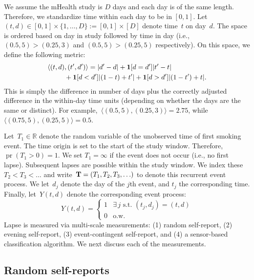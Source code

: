 \documentclass[11pt]{amsart}
\def\pr{\mathop{\text{pr}}\nolimits}
\def\pr{\mathop{\text{pr}}\nolimits}
\def\indicator{{\bf 1}}
\def\bfT{{\bf T}}
\begin{document}
We assume the mHealth study is $D$ days and each day is of the same
length. Therefore, we standardize time within each day to be in
$[0,1]$. Let $(t,d) \in [0,1] \times \{ 1,\ldots, D \} := [0,1] \times
[D]$ denote time~$t$ on day~$d$. The space is ordered based on day in
study followed by time in day (i.e., $(0.5, 5) > (0.25,3)$ and
$(0.5, 5) > (0.25, 5)$ respectively).  On this space, we define the
following metric:
\begin{align*}
\langle (t,d) &, (t^\prime, d^\prime ) \rangle = |d^\prime - d| +
\indicator [ d = d^\prime ] | t^\prime  - t | \\ 
&+ \indicator[ d < d^\prime ] | (1-t) + t^\prime | + \indicator[ d >
  d^\prime ] | (1-t^\prime) + t |.
\end{align*}
This is simply the difference in number of days plus the correctly
adjusted difference in the within-day time units (depending on whether
the days are the same or distinct).
For example,~$\langle (0.5, 5), (0.25, 3) \rangle = 2.75$, while
$\langle (0.75, 5), (0.25, 5) \rangle = 0.5$.

Let~$T_1 \in \mathbb{R}$ denote the random variable of the unobserved
time of first smoking event. The time origin is set to the start of
the study window.  Therefore,~$\pr (T_1 > 0 ) = 1$. We set $T_1 =
\infty$ if the event does not occur (i.e., no first lapse). Subsequent
lapses are possible within the study window. We index these~$T_{2} <
T_{3} < \ldots$ and write~$\bfT = (T_1, T_2, T_3,\ldots)$ to denote
this recurrent event process.  We let~$d_j$ denote the day of the
$j$th event, and $t_j$ the corresponding time. 
Finally, let~$Y(t,d)$ denote the corresponding event process:
\[
  Y(t,d) = \left \{ 
    \begin{array}{cc} 
      1 & \exists \, j \text{ s.t. } (t_j,d_j) = (t,d) \\ 
      0 & \text{o.w.} \end{array} \right .
\]
Lapse is measured via multi-scale measurements: (1) random
self-report, (2) evening self-report, (3) event-contingent
self-report, and (4) a sensor-based classification algorithm. 
We next discuss each of the measurements.

\subsection{Random self-reports}
\label{section:randomEMAs}
\end{document}
